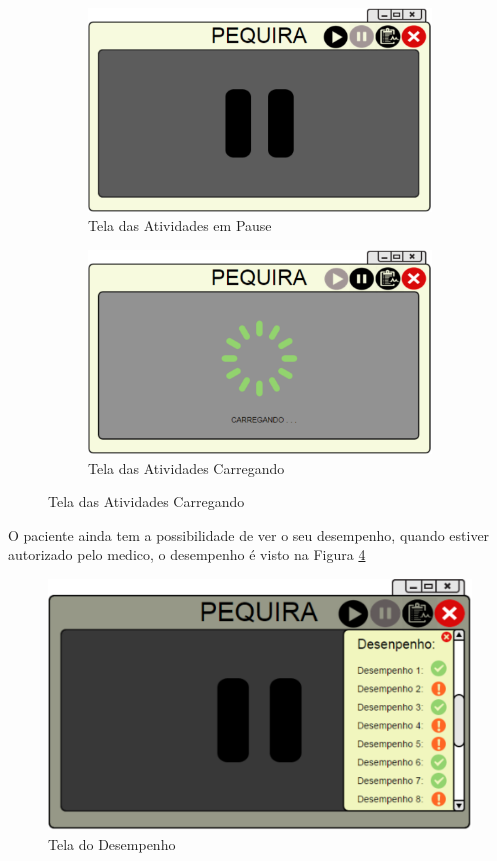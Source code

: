 \documentclass[12pt]{article}
\begin{document}
\begin{figure}[h]
\begin{subfigure}{0.5\textwidth}
\centering
\includegraphics[scale=0.4]{imagens2/2-2TeladosJogosemPausado.pdf}
\caption{Tela das Atividades em Pause}
\label{tela_atividades_pausada}
\end{subfigure}
\begin{subfigure}{0.5\textwidth}
\includegraphics[scale=0.4]{imagens2/2-3Teladosjogos,playcarregandogame.pdf} 
\caption{Tela das Atividades Carregando}
\label{tela_atividades_carregando}
\end{subfigure}
\end{figure}
\newpage{}
O paciente ainda tem a possibilidade de ver o seu desempenho, quando estiver autorizado pelo medico, o desempenho é visto na Figura \ref{tela_de_desempenho}
\begin{figure}[h]
\centering
\includegraphics[scale=0.5]{imagens2/3-1TeladoDesempenho.pdf}
\caption{Tela do Desempenho}
\label{tela_de_desempenho}
\end{figure}
\end{document}
